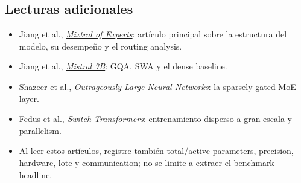 \subsection{Lecturas adicionales}

\begin{itemize}
  \item Jiang et al., \href{https://arxiv.org/abs/2401.04088}{\emph{Mixtral of Experts}}: artículo principal sobre la estructura del modelo, su desempeño y el routing analysis.
  \item Jiang et al., \href{https://arxiv.org/abs/2310.06825}{\emph{Mistral 7B}}: GQA, SWA y el dense baseline.
  \item Shazeer et al., \href{https://arxiv.org/abs/1701.06538}{\emph{Outrageously Large Neural Networks}}: la sparsely-gated MoE layer.
  \item Fedus et al., \href{https://arxiv.org/abs/2101.03961}{\emph{Switch Transformers}}: entrenamiento disperso a gran escala y parallelism.
  \item Al leer estos artículos, registre también total/active parameters, precision, hardware, lote y communication; no se limite a extraer el benchmark headline.
\end{itemize}


